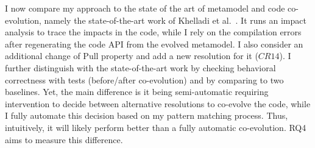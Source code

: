 I now compare my approach to the state of the art of metamodel and code co-evolution, namely the state-of-the-art work of Khelladi et al.~\cite{Khelladi2020}. It runs an impact analysis to trace the impacts in the code, while I rely on the compilation errors after regenerating the code API from the evolved metamodel. 
I also consider an additional change of Pull property and add a new resolution for it ($CR14$). 
I further distinguish with the state-of-the-art work by checking behavioral correctness with tests (before/after co-evolution) and by comparing to two baselines. 
Yet, the main difference is it being semi-automatic requiring intervention to decide between alternative resolutions to co-evolve the code, while I fully automate this decision based on my pattern matching process. Thus, intuitively, it will likely perform better than a fully automatic co-evolution. RQ4 aims to measure this difference.  

